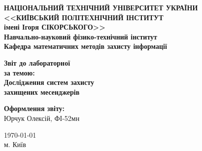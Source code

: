 \thispagestyle{empty}
\linespread{1.1}

\begin{center}
    {\bfseries\large
        НАЦІОНАЛЬНИЙ ТЕХНІЧНИЙ УНІВЕРСИТЕТ УКРАЇНИ \\
        <<КИЇВСЬКИЙ ПОЛІТЕХНІЧНИЙ ІНСТИТУТ \\
        імені Ігоря СІКОРСЬКОГО>> \\
        Навчально-науковий фізико-технічний інститут \\
        \medskip
        Кафедра математичних методів захисту інформації}
\end{center}

\begin{center}
\vspace{40mm}
{\bfseries\huge Звіт до лабораторної } \\
{\bfseries\Large за темою:} \\
{\bfseries\Large Дослідження систем захисту} \\
{\bfseries\Large захищених месенджерів} \\
\end{center}

\vspace{55mm}
\begin{center}
    \hfill
    \begin{minipage}[t]{0.4\textwidth}
        \begin{flushright}
            \textbf{Оформлення звіту:} \\
                Юрчук Олексій, ФІ-52мн \\
        \end{flushright}
    \end{minipage}
\end{center}

\vfill
\begin{center}
    \today \\
    {м. Київ}
\end{center}

\newpage
{}

